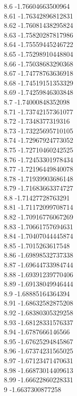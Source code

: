 {8.6	-1.76604663500964\\
8.61	-1.76342896812831\\
8.62	-1.76081438295824\\
8.63	-1.75820287817986\\
8.64	-1.75559445246722\\
8.65	-1.75298910448804\\
8.66	-1.75038683290368\\
8.67	-1.74778763636918\\
8.68	-1.74519151353329\\
8.69	-1.74259846303848\\
8.7	-1.74000848352098\\
8.71	-1.73742157361077\\
8.72	-1.7348377319316\\
8.73	-1.73225695710105\\
8.74	-1.72967924773052\\
8.75	-1.72710460242525\\
8.76	-1.72453301978434\\
8.77	-1.72196449840078\\
8.78	-1.71939903686148\\
8.79	-1.71683663374727\\
8.8	-1.71427728763291\\
8.81	-1.71172099708714\\
8.82	-1.70916776067269\\
8.83	-1.70661757694631\\
8.84	-1.70407044445874\\
8.85	-1.7015263617548\\
8.86	-1.69898532737338\\
8.87	-1.69644733984744\\
8.88	-1.69391239770406\\
8.89	-1.69138049946444\\
8.9	-1.68885164364394\\
8.91	-1.68632582875208\\
8.92	-1.68380305329258\\
8.93	-1.68128331576337\\
8.94	-1.6787666146566\\
8.95	-1.67625294845867\\
8.96	-1.67374231565025\\
8.97	-1.67123471470631\\
8.98	-1.66873014409613\\
8.99	-1.66622860228331\\
9	-1.6637300877258\\
}
